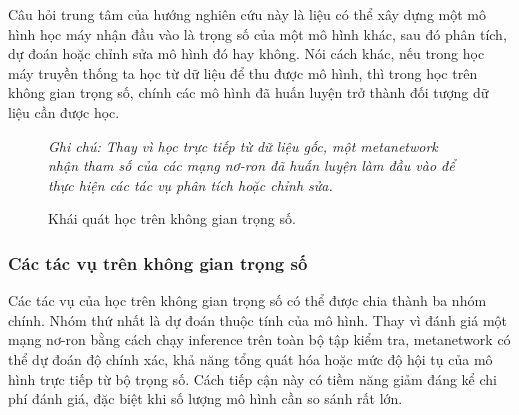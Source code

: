 Câu hỏi trung tâm của hướng nghiên cứu này là liệu có thể xây dựng một mô hình học máy nhận đầu vào là trọng số của một mô hình khác, sau đó phân tích, dự đoán hoặc chỉnh sửa mô hình đó hay không. Nói cách khác, nếu trong học máy truyền thống ta học từ dữ liệu để thu được mô hình, thì trong học trên không gian trọng số, chính các mô hình đã huấn luyện trở thành đối tượng dữ liệu cần được học.
\begin{figure}[H]
    \centering
    
    \caption[Khái quát học trên không gian trọng số]{Khái quát học trên không gian trọng số.}
    \label{fig:weight-space-learning-pipeline}
    
    \vspace{0.15cm}
    \begin{minipage}{0.9\linewidth}
        \centering
        \small\textit{Ghi chú: Thay vì học trực tiếp từ dữ liệu gốc, một metanetwork nhận tham số của các mạng nơ-ron đã huấn luyện làm đầu vào để thực hiện các tác vụ phân tích hoặc chỉnh sửa.}
    \end{minipage}
\end{figure}

\subsubsection{Các tác vụ trên không gian trọng số}

Các tác vụ của học trên không gian trọng số có thể được chia thành ba nhóm chính. Nhóm thứ nhất là dự đoán thuộc tính của mô hình. Thay vì đánh giá một mạng nơ-ron bằng cách chạy inference trên toàn bộ tập kiểm tra, metanetwork có thể dự đoán độ chính xác, khả năng tổng quát hóa hoặc mức độ hội tụ của mô hình trực tiếp từ bộ trọng số. Cách tiếp cận này có tiềm năng giảm đáng kể chi phí đánh giá, đặc biệt khi số lượng mô hình cần so sánh rất lớn.


